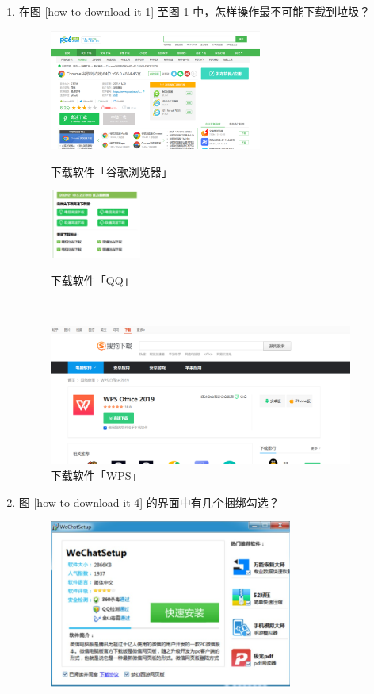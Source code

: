 \begin{enumerate}
  \item 在图 \ref{how-to-download-it-1} 至图 \ref{how-to-download-it-3} 中，怎样操作最不可能下载到垃圾？
  \begin{figure}[htb!]
    \centering
    \begin{minipage}{8cm}
      \centering
      \includegraphics[width=7cm]{assets/How_to_1.png}
      \caption{下载软件「谷歌浏览器」}
      \label{how-to-download-it-1}
    \end{minipage}
    \qquad
    \begin{minipage}{4cm}
      \centering
      \includegraphics[width=3cm]{assets/How_to_2.png}
      \caption{下载软件「QQ」}
      \label{how-to-download-it-2}
    \end{minipage}    
    \\
    \vspace{1ex}
    \begin{minipage}{12cm}
      \centering
      \includegraphics[width=10cm]{assets/How_to_3.png}
      \caption{下载软件「WPS」}
      \label{how-to-download-it-3}
    \end{minipage}
  \end{figure}
  \item 图 \ref{how-to-download-it-4} 的界面中有几个捆绑勾选？
  \begin{figure}[htbp]
    \centering
    \includegraphics[width=8cm]{assets/How_to_4.png}

\end{figure}
\end{enumerate}
